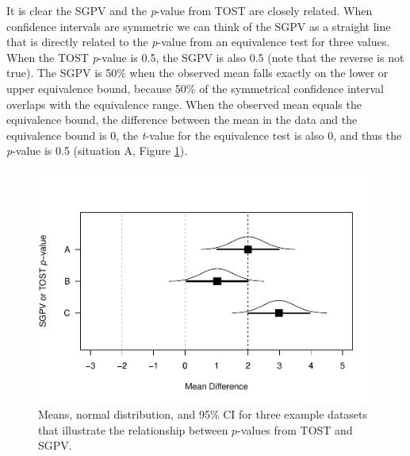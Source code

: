 \documentclass[
  english,
  man]{apa6}
\begin{document}
It is clear the SGPV and the \emph{p}-value from TOST are closely related. When confidence intervals are symmetric we can think of the SGPV as a straight line that is directly related to the \emph{p}-value from an equivalence test for three values. When the TOST \emph{p}-value is 0.5, the SGPV is also 0.5 (note that the reverse is not true). The SGPV is 50\(\%\) when the observed mean falls exactly on the lower or upper equivalence bound, because 50\(\%\) of the symmetrical confidence interval overlaps with the equivalence range. When the observed mean equals the equivalence bound, the difference between the mean in the data and the equivalence bound is 0, the \emph{t}-value for the equivalence test is also 0, and thus the \emph{p}-value is 0.5 (situation A, Figure \ref{fig:TOSTSGPV3}).

\begin{figure}

{\centering \includegraphics[height=0.94\textheight]{chp5_format-Rmd_bib_files/figure-latex/TOSTSGPV3-1} 

}

\caption{Means, normal distribution, and 95$\%$ CI for three example datasets that illustrate the relationship between $p$-values from TOST and SGPV.}\label{fig:TOSTSGPV3}
\end{figure}
\end{document}
